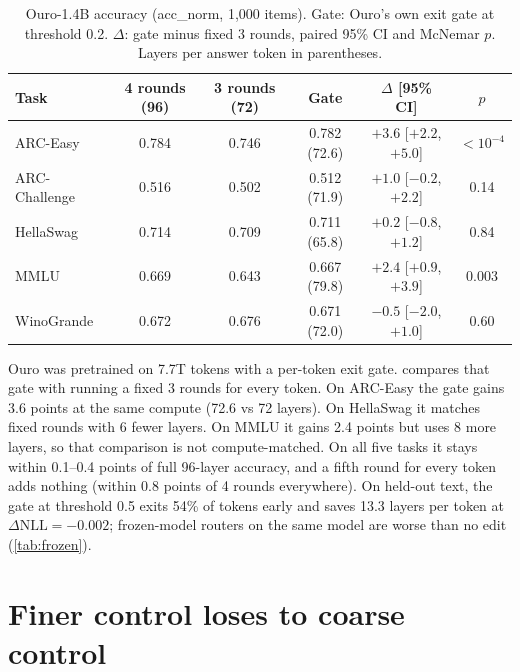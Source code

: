 \documentclass[11pt]{article}
\newcommand{\dnll}{\Delta\mathrm{NLL}}
\begin{document}
\begin{table}[t]
\centering
\caption{Ouro-1.4B accuracy (acc\_norm, 1,000 items). Gate: Ouro's own exit gate at threshold 0.2.
$\Delta$: gate minus fixed 3 rounds, paired 95\% CI and McNemar $p$. Layers per answer token in parentheses.}
\label{tab:ouro}
\small
\begin{tabular}{lccccc}
\toprule
Task & 4 rounds (96) & 3 rounds (72) & Gate & $\Delta$ [95\% CI] & $p$ \\
\midrule
ARC-Easy      & 0.784 & 0.746 & 0.782 (72.6) & $+3.6$ [$+2.2$, $+5.0$] & $<10^{-4}$ \\
ARC-Challenge & 0.516 & 0.502 & 0.512 (71.9) & $+1.0$ [$-0.2$, $+2.2$] & 0.14 \\
HellaSwag     & 0.714 & 0.709 & 0.711 (65.8) & $+0.2$ [$-0.8$, $+1.2$] & 0.84 \\
MMLU          & 0.669 & 0.643 & 0.667 (79.8) & $+2.4$ [$+0.9$, $+3.9$] & 0.003 \\
WinoGrande    & 0.672 & 0.676 & 0.671 (72.0) & $-0.5$ [$-2.0$, $+1.0$] & 0.60 \\
\bottomrule
\end{tabular}
\end{table}

Ouro was pretrained on 7.7T tokens with a per-token exit gate.  compares that gate with
running a fixed 3 rounds for every token. On ARC-Easy the gate gains 3.6 points at the same compute
(72.6 vs 72 layers). On HellaSwag it matches fixed rounds with 6 fewer layers. On MMLU it gains 2.4 points
but uses 8 more layers, so that comparison is not compute-matched. On all five tasks it stays within
0.1--0.4 points of full 96-layer accuracy, and a fifth round for every token adds nothing (within 0.8 points
of 4 rounds everywhere). On held-out text, the gate at threshold 0.5 exits 54\% of tokens early and saves
13.3 layers per token at $\dnll=-0.002$; frozen-model routers on the same model are worse than no edit
(\cref{tab:frozen}).

\section{Finer control loses to coarse control}
\label{sec:finer}
\end{document}
